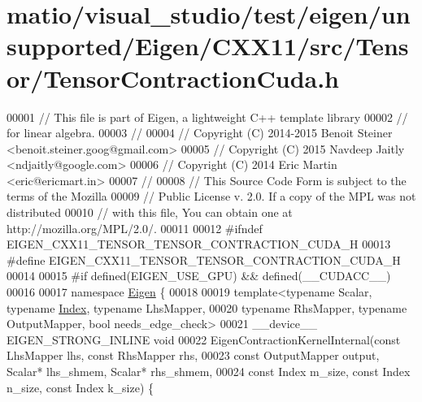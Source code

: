 \hypertarget{matio_2visual__studio_2test_2eigen_2unsupported_2_eigen_2_c_x_x11_2src_2_tensor_2_tensor_contraction_cuda_8h_source}{}\section{matio/visual\+\_\+studio/test/eigen/unsupported/\+Eigen/\+C\+X\+X11/src/\+Tensor/\+Tensor\+Contraction\+Cuda.h}
\label{matio_2visual__studio_2test_2eigen_2unsupported_2_eigen_2_c_x_x11_2src_2_tensor_2_tensor_contraction_cuda_8h_source}

\begin{DoxyCode}
00001 \textcolor{comment}{// This file is part of Eigen, a lightweight C++ template library}
00002 \textcolor{comment}{// for linear algebra.}
00003 \textcolor{comment}{//}
00004 \textcolor{comment}{// Copyright (C) 2014-2015 Benoit Steiner <benoit.steiner.goog@gmail.com>}
00005 \textcolor{comment}{// Copyright (C) 2015 Navdeep Jaitly <ndjaitly@google.com>}
00006 \textcolor{comment}{// Copyright (C) 2014 Eric Martin <eric@ericmart.in>}
00007 \textcolor{comment}{//}
00008 \textcolor{comment}{// This Source Code Form is subject to the terms of the Mozilla}
00009 \textcolor{comment}{// Public License v. 2.0. If a copy of the MPL was not distributed}
00010 \textcolor{comment}{// with this file, You can obtain one at http://mozilla.org/MPL/2.0/.}
00011 
00012 \textcolor{preprocessor}{#ifndef EIGEN\_CXX11\_TENSOR\_TENSOR\_CONTRACTION\_CUDA\_H}
00013 \textcolor{preprocessor}{#define EIGEN\_CXX11\_TENSOR\_TENSOR\_CONTRACTION\_CUDA\_H}
00014 
00015 \textcolor{preprocessor}{#if defined(EIGEN\_USE\_GPU) && defined(\_\_CUDACC\_\_)}
00016 
00017 \textcolor{keyword}{namespace }\hyperlink{namespace_eigen}{Eigen} \{
00018 
00019 \textcolor{keyword}{template}<\textcolor{keyword}{typename} Scalar, \textcolor{keyword}{typename} \hyperlink{namespace_eigen_a62e77e0933482dafde8fe197d9a2cfde}{Index}, \textcolor{keyword}{typename} LhsMapper,
00020          \textcolor{keyword}{typename} RhsMapper, \textcolor{keyword}{typename} OutputMapper, \textcolor{keywordtype}{bool} needs\_edge\_check>
00021 \_\_device\_\_ EIGEN\_STRONG\_INLINE \textcolor{keywordtype}{void}
00022 EigenContractionKernelInternal(\textcolor{keyword}{const} LhsMapper lhs, \textcolor{keyword}{const} RhsMapper rhs,
00023                                \textcolor{keyword}{const} OutputMapper output, Scalar* lhs\_shmem, Scalar* rhs\_shmem,
00024                        \textcolor{keyword}{const} Index m\_size, \textcolor{keyword}{const} Index n\_size, \textcolor{keyword}{const} Index k\_size) \{

\end{DoxyCode}
